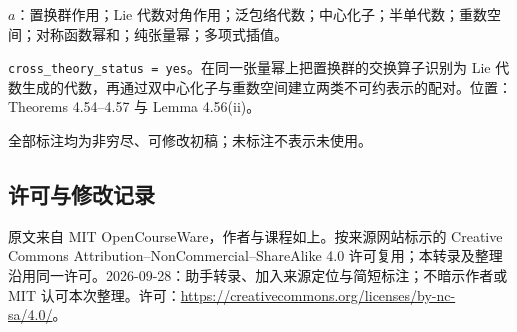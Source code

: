 \documentclass[UTF8,11pt]{ctexart}
\theoremstyle{definition}
\begin{document}
$a$：置换群作用；Lie 代数对角作用；泛包络代数；中心化子；半单代数；重数空间；对称函数幂和；纯张量幂；多项式插值。

\texttt{cross\_theory\_status = yes}。在同一张量幂上把置换群的交换算子识别为 Lie 代数生成的代数，再通过双中心化子与重数空间建立两类不可约表示的配对。位置：Theorems 4.54--4.57 与 Lemma 4.56(ii)。

全部标注均为非穷尽、可修改初稿；未标注不表示未使用。
\subsection*{许可与修改记录}
原文来自 MIT OpenCourseWare，作者与课程如上。按来源网站标示的 Creative Commons Attribution--NonCommercial--ShareAlike 4.0 许可复用；本转录及整理沿用同一许可。2026-09-28：助手转录、加入来源定位与简短标注；不暗示作者或 MIT 认可本次整理。许可：\url{https://creativecommons.org/licenses/by-nc-sa/4.0/}。
\end{document}
